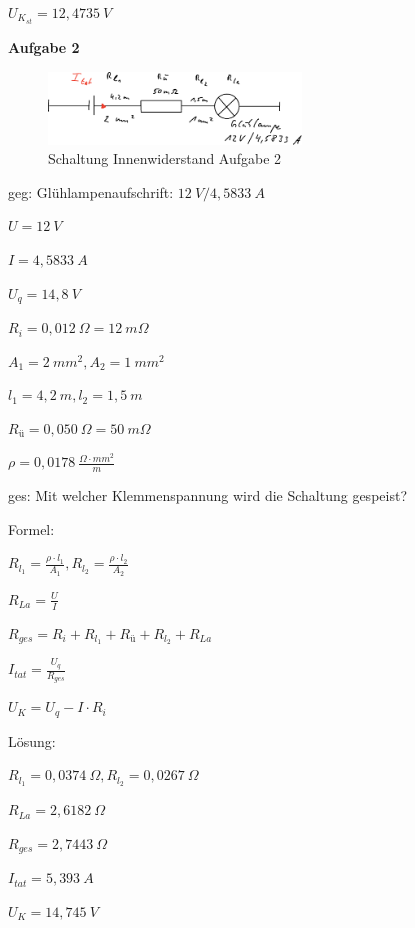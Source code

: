 $U_{K_{st}} = 12,4735~V$

\textbf{Aufgabe 2}

\begin{figure}[!ht]%
\centering
\includegraphics[width=0.6\textwidth]{images/Skizze/21_FM_Nr5_Innenwiderstand_Aufg2_Skizze.pdf}
\caption{Schaltung Innenwiderstand Aufgabe 2}
\end{figure}

geg: Glühlampenaufschrift: $12~V / 4,5833~A$

$U = 12~V$

$I = 4,5833~A$

$U_q = 14,8~V$

$R_i = 0,012~\Omega = 12~m \Omega$

$A_1 = 2~mm^2, A_2 = 1~mm^2$

$l_1 = 4,2~m, l_2 = 1,5~m$

$R_\text{ü} = 0,050~\Omega = 50~m \Omega$

$\rho = 0,0178~\frac{\Omega \cdot mm^2}{m}$

ges: Mit welcher Klemmenspannung wird die Schaltung gespeist?

Formel:

$R_{l_1} = \frac{\rho \cdot l_1}{A_1}, R_{l_2} = \frac{\rho \cdot l_2}{A_2}$

$R_{La} = \frac{U}{I}$

$R_{ges} = R_i + R_{l_1} + R_\text{ü} + R_{l_2} + R_{La}$

$I_{tat} = \frac{U_q}{R_{ges}}$

$U_K = U_q - I \cdot R_i$

Lösung:

$R_{l_1} = 0,0374~\Omega, R_{l_2} = 0,0267~\Omega$

$R_{La} = 2,6182~\Omega$

$R_{ges} = 2,7443~\Omega$

$I_{tat} = 5,393~A$

$U_K = 14,745~V$
